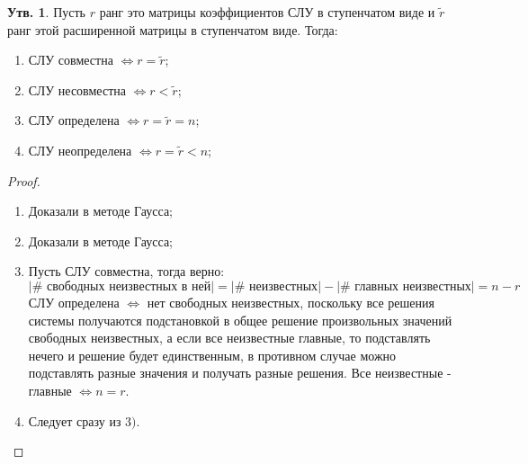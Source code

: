 \documentclass[12pt]{article}
\theoremstyle{definition}
\newtheorem{prop}{Утв.}
\newcommand{\wte}[1]{\widetilde{#1}}
\begin{document}
\begin{prop}
	Пусть $r$ ранг это матрицы коэффициентов СЛУ в ступенчатом виде и $\wte{r}$ ранг этой расширенной матрицы в ступенчатом виде. Тогда:
	\begin{enumerate}[label=\arabic*)]
		\item СЛУ совместна $\Leftrightarrow r = \wte{r}$;
		\item СЛУ несовместна $\Leftrightarrow r < \wte{r}$;
		\item СЛУ определена $\Leftrightarrow r = \wte{r} = n$;
		\item СЛУ неопределена $\Leftrightarrow r = \wte{r} < n$;
	\end{enumerate}
\end{prop}
\begin{proof}\hfill
	\begin{enumerate}[label=\arabic*)]
		\item Доказали в методе Гаусса;
		\item Доказали в методе Гаусса;
		\item Пусть СЛУ совместна, тогда верно: 
		$$
			|\#\text{ свободных неизвестных в ней}|= |\#\text{ неизвестных}| - |\#\text{ главных неизвестных}| = n - r
		$$
		СЛУ определена $\Leftrightarrow$ нет свободных неизвестных, поскольку все решения системы получаются подстановкой в общее решение произвольных значений свободных неизвестных, а если все неизвестные главные, то подставлять нечего и решение будет единственным, в противном случае можно подставлять разные значения и получать разные решения. Все неизвестные - главные $\Leftrightarrow n = r$.
		\item Следует сразу из $3)$.
	\end{enumerate}
\end{proof}
\end{document}
